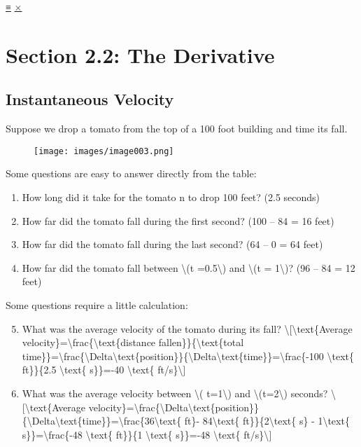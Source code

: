 \protect\hyperlink{main-nav}{≡} \protect\hyperlink{close-nav}{×}

\hypertarget{section-2.2-the-derivative}{%
\section{Section 2.2: The Derivative}\label{section-2.2-the-derivative}}

\hypertarget{instantaneous-velocity}{%
\subsection{Instantaneous Velocity}\label{instantaneous-velocity}}

Suppose we drop a tomato from the top of a 100 foot building and time
its fall.

\begin{figure}
\centering
\texttt{[image: images/image003.png]}
\caption{}
\end{figure}

Some questions are easy to answer directly from the table:

\begin{enumerate}
\tightlist
\item
  How long did it take for the tomato n to drop 100 feet? (2.5 seconds)
\item
  How far did the tomato fall during the first second? (100 -- 84 = 16
  feet)
\item
  How far did the tomato fall during the last second? (64 -- 0 = 64
  feet)
\item
  How far did the tomato fall between \textbackslash{}(t
  =0.5\textbackslash{}) and \textbackslash{}(t = 1\textbackslash{})? (96
  -- 84 = 12 feet)
\end{enumerate}

Some questions require a little calculation:

\begin{enumerate}
\setcounter{enumi}{4}
\tightlist
\item
  What was the average velocity of the tomato during its fall?
  \textbackslash{}{[}\textbackslash{}text\{Average
  velocity\}=\textbackslash{}frac\{\textbackslash{}text\{distance
  fallen\}\}\{\textbackslash{}text\{total
  time\}\}=\textbackslash{}frac\{\textbackslash{}Delta\textbackslash{}text\{position\}\}\{\textbackslash{}Delta\textbackslash{}text\{time\}\}=\textbackslash{}frac\{-100
  \textbackslash{}text\{ ft\}\}\{2.5 \textbackslash{}text\{ s\}\}=-40
  \textbackslash{}text\{ ft/s\}\textbackslash{}{]}
\item
  What was the average velocity between \textbackslash{}(
  t=1\textbackslash{}) and \textbackslash{}(t=2\textbackslash{})
  seconds? \textbackslash{}{[}\textbackslash{}text\{Average
  velocity\}=\textbackslash{}frac\{\textbackslash{}Delta\textbackslash{}text\{position\}\}\{\textbackslash{}Delta\textbackslash{}text\{time\}\}=\textbackslash{}frac\{36\textbackslash{}text\{
  ft\}- 84\textbackslash{}text\{ ft\}\}\{2\textbackslash{}text\{ s\} -
  1\textbackslash{}text\{ s\}\}=\textbackslash{}frac\{-48
  \textbackslash{}text\{ ft\}\}\{1 \textbackslash{}text\{ s\}\}=-48
  \textbackslash{}text\{ ft/s\}\textbackslash{}{]}
\end{enumerate}

